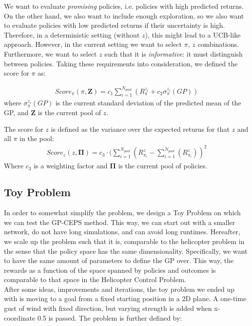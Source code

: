 We want to evaluate \textit{promising} policies, i.e. policies with high predicted returns. On the other hand, we also want to include enough exploration, so we also want to evaluate policies with low predicted returns if their uncertainty is high. Therefore, in a deterministic setting (without $z$), this might lead to a UCB-like approach. %
However, in the current setting we want to select $\pi$, $z$ combinations. Furthermore, we want to select $z$ such that it is \textit{informative}: it must distinguish between policies. Taking these requirements into consideration, we defined the score for $\pi$ as: 

\begin{align}
Score_{\pi}(\pi ,\mathbf{Z}) = c_1 \sum_{i=1}^{N_{pool}} (R_{\pi}^{z_i} + c_2 \sigma_{\pi}^{z_i}(GP)) 
\end{align}
where $\sigma_{\pi}^{z_i}(GP)$ is the current standard deviation of the predicted mean of the GP, and $\mathbf{Z}$ is the current pool of $z$. 

The score for $z$ is defined as the variance over the expected returns for that $z$ and all $\pi$ in the pool:
\begin{align}
Score_z(z, \mathbf{\Pi}) = c_3 \cdot (\sum_{i=1}^{N_{pool}}(R_{\pi_i}^z-\sum_{i=1}^{N_{pool}}(R_{\pi_i}^z) )^2
\end{align}
Where $c_3$ is a weighting factor and $\mathbf{\Pi}$ is the current pool of policies.

\subsection{Toy Problem}

In order to somewhat simplify the problem, we design a Toy Problem on which we can test the GP-CEPS method. This way, we can start out with a smaller network, do not have long simulations, and can avoid long runtimes. Hereafter, we scale up the problem such that it is, comparable to the helicopter problem in the sense that the policy space has the same dimensionality. Specifically, we want to have the same amount of parameters to define the GP over. This way, the rewards as a function of the space spanned by policies and outcomes is comparable to that space in the Helicopter Control Problem.\\
After some ideas, improvements and iterations, the toy problem we ended up with is moving to a goal from a fixed starting position in a 2D plane. A one-time gust of wind with fixed direction, but varying strength is added when x-coordinate 0.5 is passed. The problem is further defined by:

